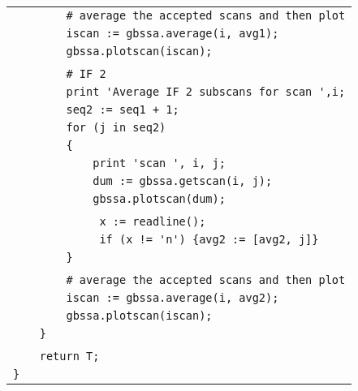 \begin{longtable}[c]{|l|}
\verb|        # average the accepted scans and then plot| \\
\verb|        iscan := gbssa.average(i, avg1);| \\
\verb|        gbssa.plotscan(iscan);| \\
\verb|| \\
\verb|        # IF 2| \\
\verb|        print 'Average IF 2 subscans for scan ',i;| \\
\verb|        seq2 := seq1 + 1;| \\
\verb|        for (j in seq2)| \\
\verb|        {| \\
\verb|            print 'scan ', i, j;| \\
\verb|            dum := gbssa.getscan(i, j);| \\
\verb|            gbssa.plotscan(dum);| \\
\verb|| \\
\verb|             x := readline();| \\
\verb|             if (x != 'n') {avg2 := [avg2, j]} | \\
\verb|        }| \\
\verb|| \\
\verb|        # average the accepted scans and then plot| \\
\verb|        iscan := gbssa.average(i, avg2);| \\
\verb|        gbssa.plotscan(iscan);| \\
\verb|    }| \\
\verb|| \\
\verb|    return T;| \\
\verb|}| \\
\end{longtable}
